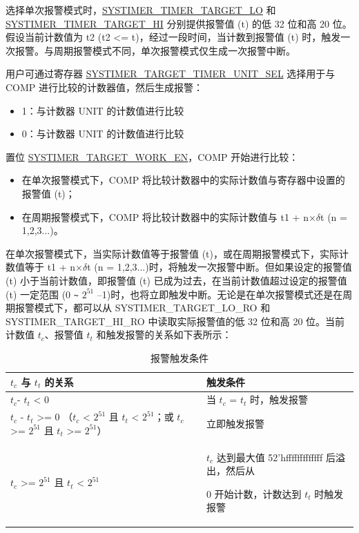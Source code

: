 \documentclass[main\_\_CN.tex]{subfiles}
\begin{document}
选择单次报警模式时，\hyperref[fielddesc:SYSTIMERTIMERTARGET0LO]{SYSTIMER\_TIMER\_TARGET\_LO} 和 \hyperref[fielddesc:SYSTIMERTIMERTARGET0HI]{SYSTIMER\_TIMER\_TARGET\_HI} 分别提供报警值 (t) 的低 32 位和高 20 位。假设当前计数值为 t2 (t2 <= t)，经过一段时间，当计数到报警值 (t) 时，触发一次报警。与周期报警模式不同，单次报警模式仅生成一次报警中断。

用户可通过寄存器 \hyperref[fielddesc:SYSTIMERTARGET0TIMERUNITSEL]{SYSTIMER\_TARGET\_TIMER\_UNIT\_SEL} 选择用于与 COMP 进行比较的计数器值，然后生成报警：

\begin{itemize}
        \item 1：与计数器 UNIT 的计数值进行比较
        \item 0：与计数器 UNIT 的计数值进行比较
\end{itemize}

置位 \hyperref[fielddesc:SYSTIMERTARGET0WORKEN]{SYSTIMER\_TARGET\_WORK\_EN}，COMP 开始进行比较：
\begin{itemize}
    \item 在单次报警模式下，COMP 将比较计数器中的实际计数值与寄存器中设置的报警值 (t)；
    \item 在周期报警模式下，COMP 将比较计数器中的实际计数值与 t1 + n×$\delta$t (n = 1,2,3...)。
\end{itemize}

在单次报警模式下，当实际计数值等于报警值 (t)，或在周期报警模式下，实际计数值等于 t1 + n×$\delta$t (n = 1,2,3...)时，将触发一次报警中断。但如果设定的报警值 (t) 小于当前计数值，即报警值 (t) 已成为过去，在当前计数值超过设定的报警值 (t) 一定范围 (0 \verb+~+ $2^{51}$ –1)时，也将立即触发中断。无论是在单次报警模式还是在周期报警模式下，都可以从 SYSTIMER\_TARGET\_LO\_RO 和 SYSTIMER\_TARGET\_HI\_RO 中读取实际报警值的低 32 位和高 20 位。当前计数值 $t_{c}$、报警值 $t_{t}$ 和触发报警的关系如下表所示：

\begin{longtable}[c]{ | p{4cm} | p{6.5cm} |}
\caption{报警触发条件}
\\\hline
\rowcolor{lightgray}
\textbf{$t_{c}$ 与 $t_{t}$ 的关系}  & \textbf{触发条件} \\ \hline
$t_{c}$- $t_{t}$ < 0 & 当 $t_{c}$ = $t_{t}$ 时，触发报警\\ \hline
$t_{c}$ - $t_{t}$ >= 0 \newline （$t_{c}$ < $2^{51}$ 且 $t_{t}$ < $2^{51}$；\newline 或 $t_{c}$ >= $2^{51}$ 且 $t_{t}$ >= $2^{51}$）& 立即触发报警\\ \hline
\multirow{2}{*}{$t_{c}$ >= $2^{51}$ 且 $t_{t}$ < $2^{51}$} & $t_{c}$ 达到最大值 52'hfffffffffffff 后溢出，然后从

0 开始计数，计数达到 $t_{t}$ 时触发报警 \\ \hline
\end{longtable}
\end{document}
